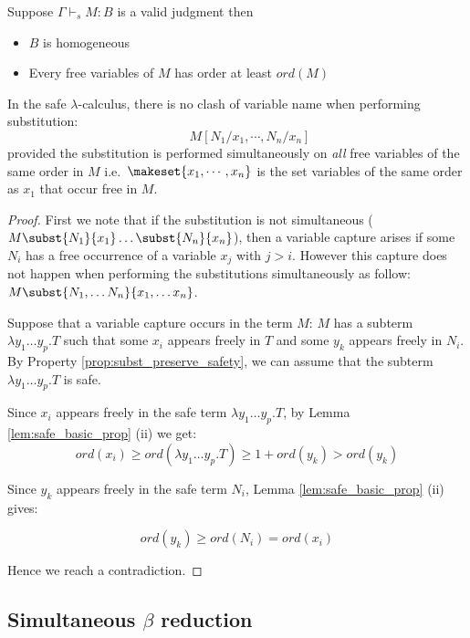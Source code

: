 \documentclass{article}
\begin{document}
\begin{lem}
\label{lem:safe_basic_prop} Suppose $\Gamma \vdash_s M : B$ is a
valid judgment then

\begin{itemize}
\item $B$ is homogeneous
\item Every free variables of $M$ has order at least $ord(M)$
\end{itemize}
\end{lem}


\begin{lem}
In the safe $\lambda$-calculus, there is no clash of variable name
when performing substitution:
\[ \qquad M[N_1 / x_1 , \cdots, N_n / x_n] \]
 provided the substitution is performed simultaneously on
\emph{all} free variables of the same order in $M$
i.e.~$\makeset{x_1, \cdots, x_n}$ is the set variables of the same
order as $x_1$ that occur free in $M$.
\end{lem}

\begin{proof}
First we note that if the substitution is not simultaneous
($M \subst{N_1}{x_1}\ldots \subst{N_n}{x_n}$),
then a variable capture arises if some $N_i$ has a free occurrence
of a variable $x_j$ with $j>i$. However this capture does not happen
when performing the substitutions simultaneously as follow:
$M \subst{N_1, \ldots N_n}{x_1, \ldots x_n}$.



Suppose that a variable capture occurs in the
term $M$: $M$ has a subterm $\lambda y_1 \ldots y_p. T$
such that some $x_i$ appears freely in $T$ and some $y_k$ appears freely in $N_i$.
By Property \ref{prop:subst_preserve_safety}, we can assume that the subterm
$\lambda y_1 \ldots y_p . T$ is safe.

Since $x_i$ appears freely in the safe term $\lambda y_1 \ldots y_p
. T$, by Lemma \ref{lem:safe_basic_prop} (ii) we get:
$$ ord(x_i) \geq ord(\lambda y_1 \ldots y_p . T) \geq 1+ ord(y_k) > ord(y_k)$$

Since $y_k$ appears freely in the safe term $N_i$, Lemma
\ref{lem:safe_basic_prop} (ii) gives:

$$ ord(y_k) \geq ord(N_i) = ord(x_i)$$

Hence we reach a contradiction.
\end{proof}


\subsection{Simultaneous $\beta$ reduction}
\end{document}
